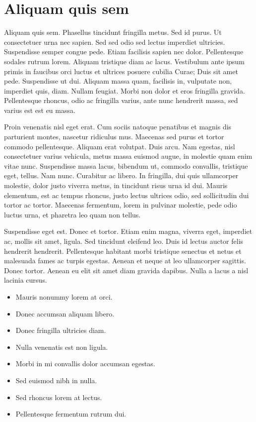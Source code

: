 \documentclass[printmode,mgr,pl]{mgr}
\begin{document}
\section{Aliquam quis sem}
Aliquam quis sem. Phasellus tincidunt fringilla metus. Sed id
purus. Ut consectetuer urna nec sapien. Sed sed odio sed lectus
imperdiet ultricies. Suspendisse semper congue pede. Etiam facilisis
sapien nec dolor. Pellentesque sodales rutrum lorem. Aliquam tristique
diam ac lacus. Vestibulum ante ipsum primis in faucibus orci luctus et
ultrices posuere cubilia Curae; Duis sit amet pede. Suspendisse ut
dui. Aliquam massa quam, facilisis in, vulputate non, imperdiet quis,
diam. Nullam feugiat. Morbi non dolor et eros fringilla
gravida. Pellentesque rhoncus, odio ac fringilla varius, ante nunc
hendrerit massa, sed varius est est eu massa.

Proin venenatis nisl eget erat. Cum sociis natoque penatibus et magnis
dis parturient montes, nascetur ridiculus mus. Maecenas sed purus et
tortor commodo pellentesque. Aliquam erat volutpat. Duis arcu. Nam
egestas, nisl consectetuer varius vehicula, metus massa euismod augue,
in molestie quam enim vitae nunc. Suspendisse massa lacus, bibendum
ut, commodo convallis, tristique eget, tellus. Nam nunc. Curabitur ac
libero. In fringilla, dui quis ullamcorper molestie, dolor justo
viverra metus, in tincidunt risus urna id dui. Mauris elementum, est
ac tempus rhoncus, justo lectus ultrices odio, sed sollicitudin dui
tortor ac tortor. Maecenas fermentum, lorem in pulvinar molestie, pede
odio luctus urna, et pharetra leo quam non tellus.

Suspendisse eget est. Donec et tortor. Etiam enim magna, viverra eget,
imperdiet ac, mollis sit amet, ligula. Sed tincidunt eleifend
leo. Duis id lectus auctor felis hendrerit hendrerit. Pellentesque
habitant morbi tristique senectus et netus et malesuada fames ac
turpis egestas. Aenean et neque at leo ullamcorper sagittis. Donec
tortor. Aenean eu elit sit amet diam gravida dapibus. Nulla a lacus a
nisl lacinia cursus.

\begin{itemize}
\item Mauris nonummy lorem at orci.
\item Donec accumsan aliquam libero.
\item Donec fringilla ultricies diam.
\item Nulla venenatis est non ligula.
\item Morbi in mi convallis dolor accumsan egestas.
\item Sed euismod nibh in nulla.
\item Sed rhoncus lorem at lectus.
\item Pellentesque fermentum rutrum dui.
\end{itemize}
\end{document}
